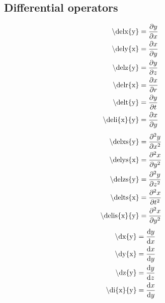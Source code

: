 \subsection{Differential operators}
\begin{subequations}
\begin{align}
\textrm{\textbackslash delx\{y\}}           & = \frac{\partial y}{\partial x}            \label{eqn:delx} \\
\textrm{\textbackslash dely\{x\}}           & = \frac{\partial x}{\partial y}            \label{eqn:dely} \\
\textrm{\textbackslash delz\{y\}}           & = \frac{\partial y}{\partial z}            \label{eqn:delz} \\
\textrm{\textbackslash delr\{x\}}           & = \frac{\partial x}{\partial r}            \label{eqn:delr} \\
\textrm{\textbackslash delt\{y\}}           & = \frac{\partial y}{\partial t}            \label{eqn:delt} \\
\textrm{\textbackslash deli\{x\}\{y\}}      & = \frac{\partial x}{\partial y}         \label{eqn:deli}
\end{align}
\end{subequations}
\begin{subequations}
\begin{align}
\textrm{\textbackslash delxs\{y\}}          & = \frac{\partial^2 y}{\partial x^2}           \label{eqn:delxs} \\
\textrm{\textbackslash delys\{x\}}          & = \frac{\partial^2 x}{\partial y^2}           \label{eqn:delys} \\
\textrm{\textbackslash delzs\{y\}}          & = \frac{\partial^2 y}{\partial z^2}           \label{eqn:delzs} \\
\textrm{\textbackslash delts\{x\}}          & = \frac{\partial^2 x}{\partial t^2}           \label{eqn:delts} \\
\textrm{\textbackslash delis\{x\}\{y\}}     & = \frac{\partial^2 x}{\partial y^2}        \label{eqn:delis}
\end{align}
\end{subequations}
\begin{subequations}
\begin{align}
\textrm{\textbackslash dx\{y\}}             & = \frac{\textrm{d} y}{\textrm{d} x}              \label{eqn:dx} \\
\textrm{\textbackslash dy\{x\}}             & = \frac{\textrm{d} x}{\textrm{d} y}              \label{eqn:dy} \\
\textrm{\textbackslash dz\{y\}}             & = \frac{\textrm{d} y}{\textrm{d} z}              \label{eqn:dz} \\
\textrm{\textbackslash di\{x\}\{y\}}        & = \frac{\textrm{d} x}{\textrm{d} y}           \label{eqn:di}
\end{align}
\end{subequations}

